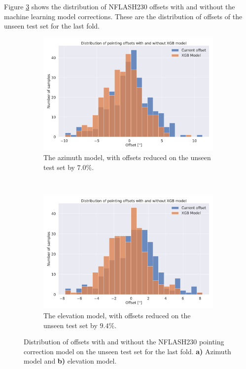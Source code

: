  
Figure \ref{fig:histogram_selected_result_xgb} shows the distribution of NFLASH230 offsets with and without the machine learning model corrections.
These are the distribution of offsets of the unseen test set for the last fold.



\begin{figure}[H]
    \centering
    \begin{subfigure}[t]{\textwidth}
        \centering
        \includegraphics[width=\textwidth]{Results/hist_XGB_ds2_tp5_k30_uncorr_az_test.pdf}
        \caption{The azimuth model, with offsets reduced on the unseen test set by $7.0\%$.}
        \label{subfig:hist_lastfold_nflash230_az}
    \end{subfigure}
    \\
    \begin{subfigure}[t]{\textwidth}
       \centering
       \includegraphics[width=\textwidth]{Results/hist_XGB_ds2_tp5_k40_uncorr_el_test.pdf}
       \caption{The elevation model, with offsets reduced on the unseen test set by $9.4\%$.}
       \label{subfig:hist_lastfold_nflash230_el}
    \end{subfigure}
    \caption[Offset distribution with and without pointing correction model]{Distribution of offsets with and without the NFLASH230 pointing correction model on the unseen test set for the last fold. \textbf{a)} Azimuth model and \textbf{b)} elevation model.}
    \label{fig:histogram_selected_result_xgb}
\end{figure}


